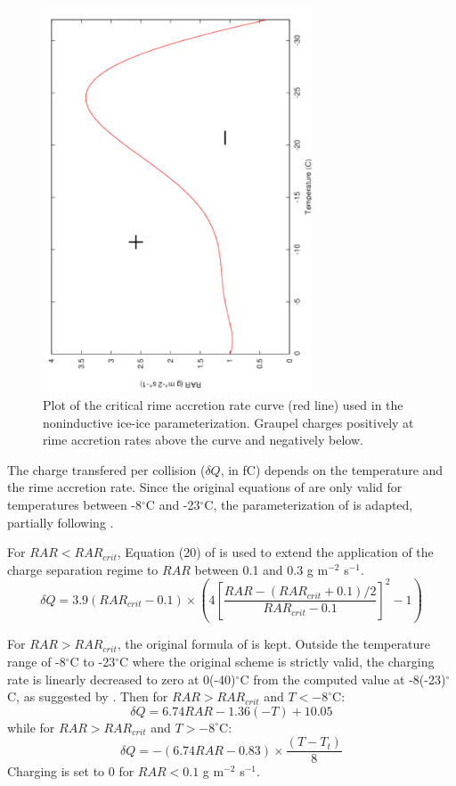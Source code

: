 \begin{figure}[h]
  \begin{center}
     \includegraphics[angle=270,width=8cm]{./EPS/saunders_peck.pdf}
  \end{center}
  \caption{Plot of the critical rime accretion rate curve (red line) used in the \citet{Saunders-1998} noninductive ice-ice parameterization. Graupel charges positively at rime accretion rates above the curve and negatively below.}
  \label{fig:saunders_peck}
\end{figure}

The charge transfered per collision ($\delta Q$, in fC) depends on the temperature and the rime accretion rate.
Since the original equations of \citet{Saunders-1998} are only valid for temperatures between -8$^{\circ}$C and -23$^{\circ}$C, the parameterization of \citet{Saunders-1998} is adapted, partially following \citet{Mansell-2005}.

For $RAR < RAR_{crit}$, Equation (20) of \citet{Mansell-2005} is used to extend the application of the charge separation regime to $RAR$ between 0.1 and 0.3 g m$^{-2}$ s$^{-1}$. 
\begin{equation}
  \delta Q = 3.9 (RAR_{crit} - 0.1) \times \left( 4 \left[ \frac{RAR - (RAR_{crit} + 0.1)/2}{RAR_{crit} - 0.1}\right]^2 -1 \right)
\end{equation}

For $RAR > RAR_{crit}$, the original formula of \citet{Saunders-1998} is kept.
Outside the temperature range of -8$^{\circ}$C to -23$^{\circ}$C where the original \citet{Saunders-1998} scheme is strictly valid, the charging rate is linearly decreased to zero at 0(-40)$^{\circ}$C from the computed value at -8(-23)$^{\circ}$C, as suggested by \citet{Mansell-2005}.
Then for $RAR > RAR_{crit}$ and $T < -8^{\circ}$C:
\begin{equation}
  \delta Q = 6.74 RAR - 1.36 (-T) + 10.05
\end{equation}
while for $RAR > RAR_{crit}$ and $T > -8^{\circ}$C:
\begin{equation}
  \delta Q = -(6.74 RAR - 0.83) \times \frac{(T-T_t)}{8}
\end{equation}
Charging is set to 0 for $RAR < 0.1$ g m$^{-2}$ s$^{-1}$.

